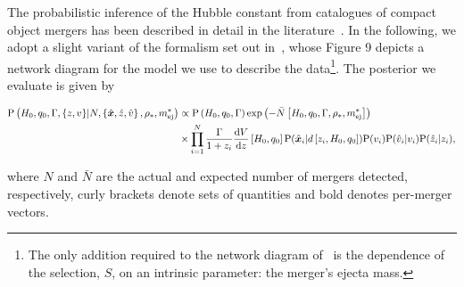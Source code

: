\documentclass[%
 reprint,
 superscriptaddress,
 nofootinbib,
 amsmath,amssymb,
 aps,
]{revtex4-2}
\newcommand{\hubble}{\ensuremath{H_0}}
\newcommand{\decel}{\ensuremath{q_0}}
\newcommand{\prob}{\ensuremath{{\rm P}}}
\newcommand{\nexp}{\bar{N}}
\newcommand{\snrmin}{\rho_*}
\newcommand{\mejmin}{m_{\rm ej}^*}
\newcommand{\dgw}{\hat{\bm{x}}}
\begin{document}
The probabilistic inference of the Hubble constant from catalogues of compact object mergers has been described in detail in the literature~\citep{Schutz:1986,Dalal:2006,Nissanke_etal:2010,Taylor_etal:2012,Nissanke_etal:2013,Abbott_etal:2017a,Chen_etal:2018,Fishbach_etal:2018,Feeney_etal:2018,Mandel_etal:2018,Gray_etal:2019,Mortlock_etal:2019}. In the following, we adopt a slight variant of the formalism set out in~\cite{Mortlock_etal:2019}, whose Figure 9 depicts a network diagram for the model we use to describe the data\footnote{The only addition required to the network diagram of~\cite{Mortlock_etal:2019} is the dependence of the selection, $S$, on an intrinsic parameter: the merger's ejecta mass.}. The posterior we evaluate is given by
\begin{widetext}
\begin{align}
\prob \left( \hubble, \decel, \Gamma, \{z, v\} | N, \left\{ \dgw, \hat{z}, \hat{v} \right\}, \snrmin, \mejmin \right) & \propto
\prob \left( \hubble, \decel, \Gamma \right) \exp \left( -\bar{N} \left[ \hubble, \decel, \Gamma, \snrmin, \mejmin \right] \right) \\
& \times \prod_{i = 1}^{N} \frac{\Gamma}{1 + z_i} \frac{{\rm d}V}{{\rm d}z} \left[ \hubble, \decel \right] \prob (\dgw_i | d \left[ z_i, \hubble, \decel \right]) \prob(v_i) \prob(\hat{v}_i | v_i) \prob(\hat{z}_i | z_i), \nonumber
\end{align}
\end{widetext}
%
%
where $N$ and $\nexp$ are the actual and expected number of mergers detected, respectively, curly brackets denote sets of quantities and bold denotes per-merger vectors.
\end{document}
